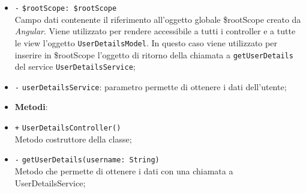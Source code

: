 \begin{itemize}
\begin{itemize}
\begin{itemize}
		\item \texttt{-} \texttt{\$rootScope: \$rootScope} \\
		Campo dati contenente il riferimento all'oggetto globale \$rootScope creato da \textit{Angular}. Viene utilizzato per rendere accessibile a tutti i controller e a tutte le view l'oggetto \texttt{UserDetailsModel}. In questo caso viene utilizzato per inserire in \$rootScope l'oggetto di ritorno della chiamata a \texttt{getUserDetails} del service \texttt{UserDetailsService};
		\item \texttt{-} \texttt{userDetailsService}: parametro permette di ottenere i dati dell'utente;
	\end{itemize}	
	\begin{itemize}
		\item \textbf{Metodi}:
		\item \texttt{+} \texttt{UserDetailsController()} \\ Metodo costruttore della classe;
		\item \texttt{-} \texttt{getUserDetails(username: String)} \\ Metodo che permette di ottenere i dati con una chiamata a UserDetailsService;
	\end{itemize}
\end{itemize}


\end{itemize}
